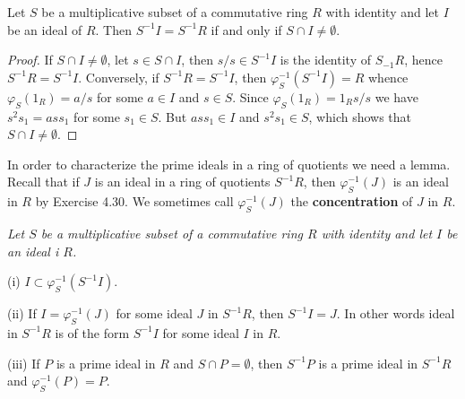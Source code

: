 \begin{theorem}
Let $S$ be a multiplicative subset of a commutative ring $R$ with identity and let $I$ be an ideal of $R$. Then $S^{-1}I=S^{-1}R$ if and only if $S\cap I\ne\emptyset$.
\end{theorem}
\begin{proof}
If $S\cap I\ne\emptyset$, let $s\in S\cap I$, then $s/s\in S^{-1}I$ is the identity of $S_{-1}R$, hence $S^{-1}R=S^{-1}I$. Conversely, if $S^{-1}R=S^{-1}I$, then $\varphi_S^{-1}(S^{-1}I)=R$ whence $\varphi_S(1_R)=a/s$ for some $a\in I$ and $s\in S$. Since $\varphi_S(1_R)=1_Rs/s$ we have $s^2s_1=ass_1$ for some $s_1\in S$. But $ass_1\in I$ and $s^2s_1\in S$, which shows that $S\cap I\ne\emptyset$.
\end{proof}
In order to characterize the prime ideals in a ring of quotients we need a lemma. Recall that if $J$ is an ideal in a ring of quotients $S^{-1}R$, then $\varphi_S^{-1}(J)$ is an ideal in $R$ by Exercise 4.30. We sometimes call $\varphi_S^{-1}(J)$ the \textbf{concentration} of $J$ in $R$.
\begin{lemma}\em
Let $S$ be a multiplicative subset of a commutative ring $R$ with identity and let $I$ be an ideal i $R$.\par
(i) $I\subset\varphi_S^{-1}(S^{-1}I)$.\par
(ii) If $I=\varphi_S^{-1}(J)$ for some ideal $J$ in $S^{-1}R$, then $S^{-1}I=J$. In other words ideal in $S^{-1}R$ is of the form $S^{-1}I$ for some ideal $I$ in $R$.\par
(iii) If $P$ is a prime ideal in $R$ and $S\cap P=\emptyset$, then $S^{-1}P$ is a prime ideal in $S^{-1}R$ and $\varphi_S^{-1}(P)=P$.
\end{lemma}
